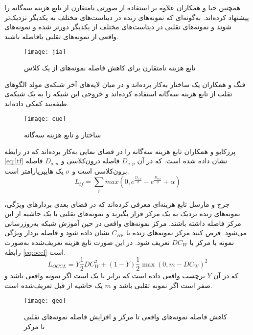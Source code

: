 همچنین جیا و همکاران
\cite{jia2020single}
 علاوه بر استفاده از  صورتی نامتقارن از تابع هزینه سه‌گانه را پیشنهاد کرده‌اند. به‌گونه‌ای که نمونه‌های زنده در دیتاست‌های مختلف به یکدیگر نزدیک‌تر شوند و نمونه‌های تقلبی در دیتاست‌های مختلف از یکدیگر دورتر شده و نمونه‌های واقعی از نمونه‌های تقلبی با‌فاصله باشند. 
 
 \begin{figure}[h]
 	\centerline{\texttt{[image: jia]}}
 	\caption{تابع هزینه نامتقارن برای کاهش فاصله نمونه‌های از یک کلاس \cite{jia2020single} }
 	\label{fig:jia}
 \end{figure}

فنگ و همکاران
\cite{feng2020learning}
یک ساختار 
\cite{ronneberger2015u}
به‌کار برده‌اند و در میان لایه‌های آخر شبکه‌ی مولد الگوهای تقلب از تابع هزینه سه‌گانه استفاده کرده‌اند و خروجی این شبکه  را به یک شبکه‌ی طبقه‌بند کمکی داده‌اند.

 \begin{figure}[h]
	\centerline{\texttt{[image: cue]}}
	\caption{ساختار  و تابع هزینه سه‌گانه \cite{feng2020learning} }
	\label{fig:cue}
\end{figure}

پرزکابو و همکاران
\cite{perez2019deep}
تابع هزینه سه‌گانه را در فضای نمایی به‌کار برده‌اند که در رابطه
\ref{eq:ltf}
نشان داده شده است. که در آن
$D_{a,p}$
فاصله درون‌کلاسی و
$D_{a,n}$
فاصله برون‌کلاسی است و
$\sigma$
یک هایپر‌پارامتر است.
 \begin{equation}\label{eq:ltf}
	L_{tf} = \sum_{i}{max(0,e^{\frac{D_{a,p}}{\sigma}}-e^{\frac{D_{a,n}}{\sigma}}+\alpha)}
\end{equation}

جرج و مارسل
\cite{george2020learning} 
 تابع هزینه‌ای معرفی کرده‌اند که در فضای  بعدی بردارهای ویژگی، نمونه‌های زنده نزدیک به یک مرکز قرار بگیرند و نمونه‌های تقلبی با یک حاشیه از این مرکز فاصله داشته باشند. مرکز نمونه‌های واقعی در حین آموزش شبکه به‌روزرسانی می‌شود.
فرض کنید مرکز نمونه‌های زنده با 
$C_{BF}$
 نشان داده شود و فاصله بردار ویژگی نمونه  با مرکز با 
$DC_W$ 
  تعریف شود. در این صورت تابع هزینه تعریف‌شده به‌صورت رابطه
\ref{eq:occl}
است.
 \begin{equation}\label{eq:occl}
L_{OCCL}=Y\frac{1}{2}DC^2_W+(1-Y)\frac{1}{2}\max(0,m-DC_W)^2
\end{equation}
که در آن $Y$ برچسب واقعی داده است که برابر با یک است اگر نمونه واقعی باشد و صفر است اگر نمونه تقلبی باشد و $m$ یک حاشیه از قبل تعریف‌شده است.
 \begin{figure}[h]
	\centerline{\texttt{[image: geo]}}
	\caption{کاهش فاصله نمونه‌های واقعی تا مرکز و افزایش فاصله نمونه‌های تقلبی تا مرکز \cite{george2020learning} }
	\label{fig:geo}
\end{figure}

